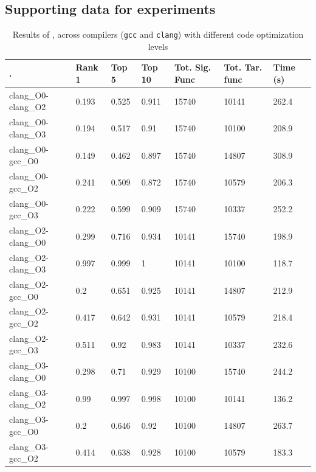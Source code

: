 

 \begin{appendices}
 \newpage
 \section{Supporting data for experiments} \label{app: exp_data1}

 \begin{table}[!ht]
	\centering
	\scriptsize
	\caption{Results of \tool, across compilers (\texttt{gcc} and \texttt{clang}) with different code optimization levels\\}\label{tab:diff_comp} %

\begin{tabular}{ | p{2.28cm} | p{0.57cm} | p{0.57cm} | p{0.57cm} | p{0.57cm} | p{0.57cm} | p{0.57cm} | }
\hline
	. & Rank 1 & Top 5 & Top 10 & Tot. Sig. Func & Tot. Tar. func & Time (s)  \  \\ \hline
	clang\_O0-clang\_O2 & 0.193 & 0.525 & 0.911 & 15740 & 10141 & 262.4 \\ \hline
	clang\_O0-clang\_O3 & 0.194 & 0.517 & 0.91 & 15740 & 10100 & 208.9 \\ \hline
	clang\_O0-gcc\_O0 & 0.149 & 0.462 & 0.897 & 15740 & 14807 & 308.9 \\ \hline
	clang\_O0-gcc\_O2 & 0.241 & 0.509 & 0.872 & 15740 & 10579 & 206.3 \\ \hline
	clang\_O0-gcc\_O3 & 0.222 & 0.599 & 0.909 & 15740 & 10337 & 252.2 \\ \hline
	clang\_O2-clang\_O0 & 0.299 & 0.716 & 0.934 & 10141 & 15740 & 198.9 \\ \hline
	clang\_O2-clang\_O3 & 0.997 & 0.999 & 1 & 10141 & 10100 & 118.7 \\ \hline
	clang\_O2-gcc\_O0 & 0.2 & 0.651 & 0.925 & 10141 & 14807 & 212.9 \\ \hline
	clang\_O2-gcc\_O2 & 0.417 & 0.642 & 0.931 & 10141 & 10579 & 218.4 \\ \hline
	clang\_O2-gcc\_O3 & 0.511 & 0.92 & 0.983 & 10141 & 10337 & 232.6 \\ \hline
	clang\_O3-clang\_O0 & 0.298 & 0.71 & 0.929 & 10100 & 15740 & 244.2 \\ \hline
	clang\_O3-clang\_O2 & 0.99 & 0.997 & 0.998 & 10100 & 10141 & 136.2 \\ \hline
	clang\_O3-gcc\_O0 & 0.2 & 0.646 & 0.92 & 10100 & 14807 & 263.7 \\ \hline
	clang\_O3-gcc\_O2 & 0.414 & 0.638 & 0.928 & 10100 & 10579 & 183.3 \\ \hline

\end{tabular}
\end{table}
\end{appendices}
